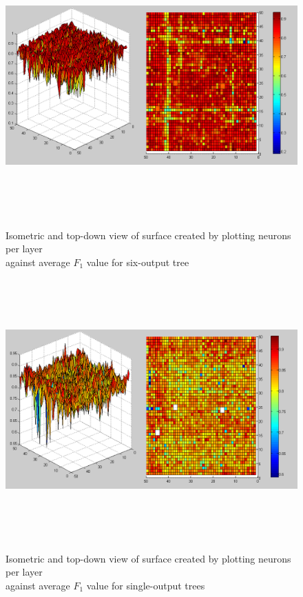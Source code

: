 \documentclass[a4paper]{article}
\begin{document}
\begin{figure}[p]
  \centering
  {\includegraphics[height=100mm]{6-out-topology.png}}
  \caption{Isometric and top-down view of surface created by plotting neurons per layer \\ against average $F_1$ value for six-output tree}
\end{figure}

\begin{figure}[p]
  \centering
  {\includegraphics[height=100mm]{1-out-topology.png}}
  \caption{Isometric and top-down view of surface created by plotting neurons per layer \\ against average $F_1$ value for single-output trees}
\end{figure}
\end{document}
